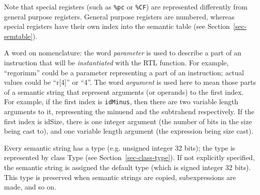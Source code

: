 Note that special registers (such as {\tt \%pc} or {\tt \%CF}) are
represented differently from general purpose registers. General purpose
registers are numbered, whereas special registers have their own
index into the semantic table (see Section~\ref{sec-semtable}).

A word on nomenclature: the word {\it parameter} is used to describe
a part of an instruction that will be {\it instantiated} with the
RTL function. For example, ``regorimm'' could be a parameter representing
a part of an instruction; actual values could be ``r[4]'' or ``4''.
The word {\it argument} is used here to mean those parts of a semantic
string that represent arguments (or operands) to the first index. For example,
if the first index is {\tt idMinus}, then there are two variable length
arguments to it, representing the minuend and the subtrahend respectively.
If the first index is idSize, there is one integer argument (the number
of bits in the size being cast to), and one variable length argument
(the expression being size cast).

Every semantic string has a type (e.g. unsigned integer 32 bits); the type is
represented by class Type (see Section~\ref{sec-class-type}). If not explicitly
specified, the semantic string is assigned the default type (which is signed
integer 32 bits). This type is preserved when semantic strings are copied,
subexpressions are made, and so on.


